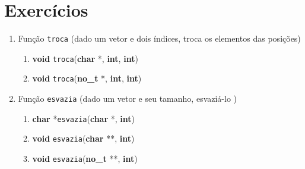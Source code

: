 \section{Exercícios}
\begin{frame}[label=notas]
	\begin{enumerate}
		\item Função \texttt{troca} (dado um vetor e dois índices, troca os elementos das posições)
			\begin{enumerate}
				\item \textbf{void} \texttt{troca}(\textbf{char} *, \textbf{int}, \textbf{int})
				\item \textbf{void} \texttt{troca}(\textbf{no\_t} *, \textbf{int}, \textbf{int})
			\end{enumerate}
			\pause\vfill
		\item Função \texttt{esvazia} (dado um vetor e seu tamanho, esvaziá-lo
		)
			\begin{enumerate}
				\item \textbf{char} *\texttt{esvazia}(\textbf{char} *, \textbf{int})
				\item \textbf{void} \texttt{esvazia}(\textbf{char} **, \textbf{int})
				\item \textbf{void} \texttt{esvazia}(\textbf{no\_t} **, \textbf{int})
			\end{enumerate}

	\end{enumerate}

\end{frame}